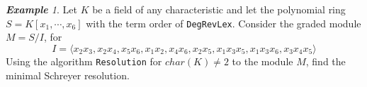 \documentclass{article}
\theoremstyle{definition}
\theoremstyle{remark}
\theoremstyle{example}
\newtheorem{example}{\textbf{Example}}[section]
\begin{document}
\begin{example}
    Let $K$ be a field of any characteristic and let the polynomial ring $S = K[x_1,\cdots,x_6]$ with the term order of \verb+DegRevLex+. Consider the graded module $M = S/I$, for 
    \begin{equation}
        I = \langle x_2x_3,x_2x_4,x_5x_6,x_1x_2,x_4x_6,x_2x_5,x_1x_3x_5,x_1x_3x_6,x_3x_4x_5\rangle
    \end{equation} 
    Using the algorithm \verb+Resolution+ for $char(K) \neq 2$ to the module $M$, find the minimal Schreyer resolution.
\end{example}

\paragraph{  }
\end{document}
